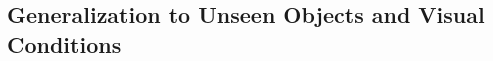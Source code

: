 \documentclass{article} %
\begin{document}










\subsection{Generalization to Unseen Objects and Visual Conditions}
\label{sec:generalization}
\end{document}
